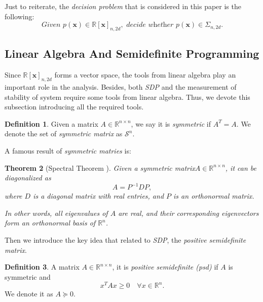 \documentclass[12pt]{amsart}
\numberwithin{equation}{section}
\newtheorem{thm}{Theorem}
\theoremstyle{definition}
\newtheorem{definition}[thm]{Definition}
\numberwithin{thm}{section}
\begin{document}
Just to reiterate, the \emph{decision problem} that is considered in this paper is the following: 
\begin{equation}
     \textit{Given } p(\mathbf{x}) \in \mathbb{R}[\mathbf{x}]_{n, 2d}, \textit{ decide whether } p(\mathbf{x}) \in \Sigma_{n, 2d} \label{eq:dp}.
\end{equation}


\newpage

\subsection{Linear Algebra And Semidefinite Programming}
\label{Sec:Linear Algebra}

Since $\mathbb{R}[\mathbf{x}]_{n, 2d}$ forms a vector space, the tools from linear algebra play an important role in the analysis. 
Besides, both \emph{SDP} and the measurement of stability of system require some tools from linear algebra. 
Thus, we devote this subsection introducing all the required tools. 

\begin{definition}
     Given a matrix $A \in \mathbb{R}^{n \times n}$, we say it is \emph{symmetric} if $A^T = A$. We denote the set of \emph{symmetric matrix} as $\mathcal{S}^n$.  
\end{definition}

A famous result of \emph{symmetric matries} is:
\begin{thm} [Spectral Theorem \cite{golub1996matrix}]

     Given a symmetric matrix$A \in \mathbb{R}^{n \times n}$, 
     it can be diagonalized as \begin{equation*} A = P^{-1}DP, \end{equation*}
     where $D$ is a diagonal matrix with real entries, and $P$ is an orthonormal matrix.
     
     In other words, all eigenvalues of $A$ are real, and their corresponding eigenvectors form an orthonormal basis of $\mathbb{R}^n$. 
\end{thm} 

\smallskip

Then we introduce the key idea that related to \emph{SDP}, the \emph{positive semidefinite matrix}.

\begin{definition}
     A matrix $A \in \mathbb{R}^{n \times n}$, it is \emph{positive semidefinite (psd)} if $A$ is symmetric and \begin{equation*}
          x^T A x \geq 0 \quad \forall x \in \mathbb{R}^n.
     \end{equation*}
     We denote it as $A \succcurlyeq 0$.
\end{definition}
\end{document}
